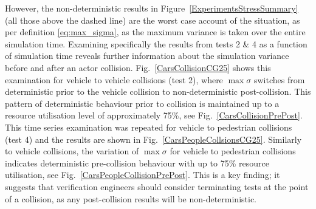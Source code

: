 \documentclass[letterpaper, 10 pt, journal, twoside]{IEEEtran}
\begin{document}
However, the non-deterministic results in Figure~\ref{ExperimentsStressSummary} (all those above the dashed line) are the worst case account of the situation, as per definition \ref{eq:max_sigma}, as the maximum variance is taken over the entire simulation time.
%
Examining specifically the results from tests 2 \& 4 as a function of simulation time reveals further information about the simulation variance before and after an actor collision. Fig.~\ref{CarsCollisionCG25} shows this examination for vehicle to vehicle collisions (test 2), where $\max\sigma$ switches from deterministic prior to the vehicle collision to non-deterministic post-collision. This pattern of deterministic behaviour prior to collision is maintained up to a resource utilisation level of approximately 75\%, see Fig.~\ref{CarsCollisionPrePost}. This time series examination was repeated for vehicle to pedestrian collisions (test 4) and the results are shown in Fig.~\ref{CarsPeopleCollsionsCG25}. Similarly to vehicle collisions, the variation of $\max\sigma$ for vehicle to pedestrian collisions indicates deterministic pre-collision behaviour with up to 75\% resource utilisation, see Fig.~\ref{CarsPeopleCollisionPrePost}. This is a key finding; it suggests that verification engineers should consider terminating tests at the point of a collision, as any post-collision results will be non-deterministic. %
\end{document}
